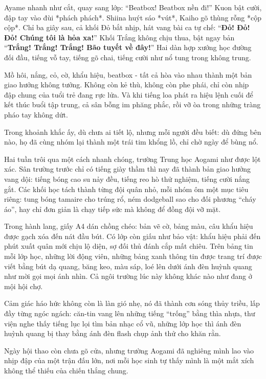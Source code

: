 \documentclass[../main.tex]{subfiles}
\begin{document}
Ayame nhanh như cắt, quay sang lớp: ``Beatbox! Beatbox nền đi!'' Kuon bật cười, đập tay vào đùi *phách phách*. Shiina huýt sáo *vút*, Kaiho gõ thùng rỗng *cộp cộp*. Chỉ ba giây sau, cả khối Đỏ bắt nhịp, hát vang bài ca tự chế: ``\textbf{Đỏ! Đỏ! Đỏ! Chúng tôi là hỏa xa!}'' Khối Trắng không chịu thua, bật ngay bản ``\textbf{Trắng! Trắng! Trắng! Bão tuyết về đây!}'' Hai dàn hợp xướng học đường đối đầu, tiếng vỗ tay, tiếng gõ chai, tiếng cười như nổ tung trong không trung.

Mồ hôi, nắng, cỏ, cờ, khẩu hiệu, beatbox - tất cả hòa vào nhau thành một bản giao hưởng không tưởng. Không còn kẻ thù, không còn phe phái, chỉ còn nhịp đập chung của tuổi trẻ đang rực lửa. Và khi tiếng loa phát ra hiệu lệnh cuối để kết thúc buổi tập trung, cả sân bỗng im phăng phắc, rồi vỡ òa trong những tràng pháo tay không dứt.

Trong khoảnh khắc ấy, dù chưa ai tiết lộ, nhưng mỗi người đều biết: dù đứng bên nào, họ đã cùng nhóm lại thành một trái tim khổng lồ, chỉ chờ ngày để bùng nổ.

\ct

Hai tuần trôi qua một cách nhanh chóng, trường Trung học Aogami như được lột xác. Sân trường trước chỉ có tiếng giày thầm thì nay đã thành bản giao hưởng vang dội: tiếng bóng cao su nảy đều, tiếng reo hò thử nghiệm, tiếng cười nắng gắt. Các khối học tách thành từng đội quân nhỏ, mỗi nhóm ôm một mục tiêu riêng: tung bóng tamaire cho trúng rổ, ném dodgeball sao cho đối phương ``cháy áo'', hay chỉ đơn giản là chạy tiếp sức mà không để đồng đội vỡ mặt.

Trong hành lang, giấy A4 dán chồng chéo: bản vẽ cờ, bảng màu, câu khẩu hiệu được gạch xóa đến nát đầu bút. Có lớp còn giấu như bảo vật: khẩu hiệu phải đến phút xuất quân mới chịu lộ diện, sợ đối thủ đánh cắp mất chiêu. Trên bảng tin mỗi lớp học, những lời động viên, những bảng xanh thông tin được trang trí được viết bằng bút dạ quang, băng keo, màu sáp, loé lên dưới ánh đèn huỳnh quang như mời gọi mọi ánh nhìn. Cả ngôi trường lúc này không khác nào như đang ở mội hội chợ.

Cảm giác háo hức không còn là làn gió nhẹ, nó đã thành cơn sóng thủy triều, lấp đầy từng ngóc ngách: căn-tin vang lên những tiếng ``trống'' bằng thìa nhựa, thư viện nghe thấy tiếng lục lọi tìm bản nhạc cổ vũ, những lớp học thì ánh đèn huỳnh quang bị thay bằng ánh đèn flash chụp ảnh thử cho khăn rằn.

Ngày hội thao còn chưa gõ cửa, nhưng trường Aogami đã nghiêng mình lao vào nhịp đập của một trận đấu lớn, nơi mỗi học sinh tự thấy mình là một mắt xích không thể thiếu của chiến thắng chung.
\end{document}
